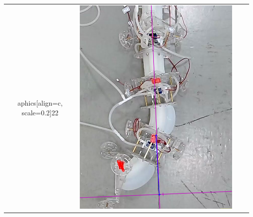 \documentclass[twoside, 11pt]{article}
\begin{document}
\begin{table} [H]
\begin{tabular}{|c|c|c|c|}
aphics[align=c, scale=0.2]{22} & \includegraphics[align=c, scale=0.2]{33}\\

\end{tabular}
\end{table}
\end{document}
